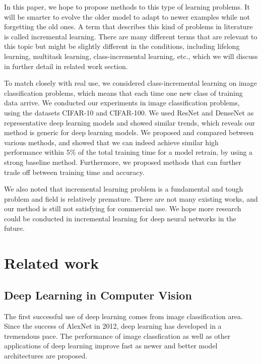 In this paper, we hope to propose methods to this type of learning problems. It will be smarter to evolve the older model to adapt to newer examples while not forgetting the old ones. A term that describes this kind of problems in literature is called incremental learning. There are many different terms that are relevant to this topic but might be slightly different in the conditions, including lifelong learning, multitask learning, class-incremental learning, etc.\cite{utgoff1989incremental}, which we will discuss in further detail in related work section.

To match closely with real use, we considered class-incremental learning on image classification problems, which means that each time one new class of training data arrive. We conducted our experiments in image classification problems, using the datasets CIFAR-10 and CIFAR-100\cite{krizhevsky2009learning}. We used ResNet\cite{he2016deep} and DenseNet\cite{huang2017densely} as representative deep learning models and showed similar trends, which reveals our method is generic for deep learning models. We proposed and compared between various methods, and showed that we can indeed achieve similar high performance within $5\%$ of the total training time for a model retrain, by using a strong baseline method. Furthermore, we proposed methods that can further trade off between training time and accuracy.

We also noted that incremental learning problem is a fundamental and tough problem and field is relatively premature. There are not many existing works, and our method is still not satisfying for commercial use. We hope more research could be conducted in incremental learning for deep neural networks in the future.
\section{Related work}
\subsection{Deep Learning in Computer Vision}
The first successful use of deep learning comes from image classification area. Since the success of AlexNet\cite{krizhevsky2012imagenet} in 2012, deep learning has developed in a tremendous pace. The performance of image classfication as well as other applications of deep learning improve fast as newer and better model architectures are proposed.

